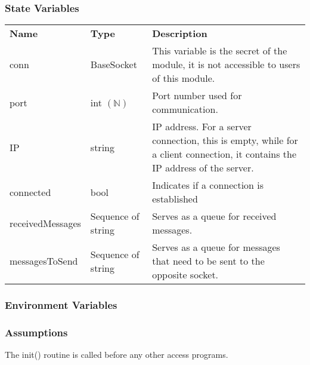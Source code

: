 \documentclass[12pt, titlepage]{article}
\begin{document}
\subsubsection{State Variables}
\begin{center}
\begin{tabular}{p{3 cm} p{3.5cm} p{7cm} }
\hline
\textbf{Name} & \textbf{Type} & \textbf{Description}  \\
conn & BaseSocket & This variable is the secret of the module, it is not accessible to users of this module. \\
port & int $(\mathbb{N})$& Port number used for communication. \\
IP & string & IP address. For a server connection, this is empty, while for a client connection, it contains the IP address of the server. \\
connected & bool & Indicates if a connection is established \\
receivedMessages & Sequence of string & Serves as a queue for received messages. \\
messagesToSend & Sequence of string & Serves as a queue for messages that need to be sent to the opposite socket. \\
\hline
\hline
\end{tabular}
\end{center}
\subsubsection{Environment Variables}
\subsubsection{Assumptions}
The init() routine is called before any other access programs.
\end{document}
